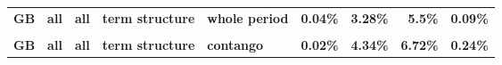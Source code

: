 \documentclass[
  authoryear,
  preprint,
  3p]{elsarticle}
\begin{document}
\begin{landscape}
\begin{longtable}[t]{>{}l>{}l>{}l>{}l>{}l>{}r>{}r>{}r>{}r}
\textbf{GB} & \textbf{all} & \textbf{all} & \textbf{term structure} & \textbf{whole period} & \textcolor[HTML]{4285f4}{\textbf{0.04\%}} & \textcolor[HTML]{4285f4}{\textbf{3.28\%}} & \textcolor[HTML]{4285f4}{\textbf{5.5\%}} & \textcolor[HTML]{4285f4}{\textbf{0.09\%}}\\
\textbf{\cellcolor{gray!10}{GB}} & \textbf{\cellcolor{gray!10}{all}} & \textbf{\cellcolor{gray!10}{all}} & \textbf{\cellcolor{gray!10}{term structure}} & \textbf{\cellcolor{gray!10}{backwardation}} & \textcolor[HTML]{4285f4}{\textbf{\cellcolor{gray!10}{0.17\%}}} & \textcolor[HTML]{4285f4}{\textbf{\cellcolor{gray!10}{2.37\%}}} & \textcolor[HTML]{4285f4}{\textbf{\cellcolor{gray!10}{3.67\%}}} & \textcolor[HTML]{4285f4}{\textbf{\cellcolor{gray!10}{0.09\%}}}\\
\addlinespace
\textbf{GB} & \textbf{all} & \textbf{all} & \textbf{term structure} & \textbf{contango} & \textcolor[HTML]{4285f4}{\textbf{0.02\%}} & \textcolor[HTML]{4285f4}{\textbf{4.34\%}} & \textcolor[HTML]{4285f4}{\textbf{6.72\%}} & \textcolor[HTML]{4285f4}{\textbf{0.24\%}}\\
\bottomrule

\end{longtable}

\endgroup{}
\end{landscape}

\newpage


\renewcommand\refname{References}
  
\end{document}
